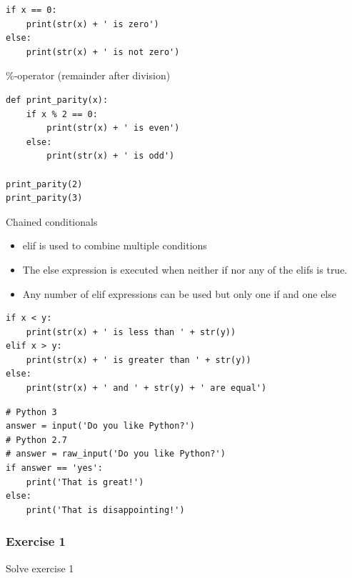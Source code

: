 \documentclass[10pt, a4paper]{beamer} %
\newcommand{\lb}[1]{{\color{mLightBrown}#1}}
\begin{document}
\begin{frame}
\begin{lstlisting}
if x == 0:
    print(str(x) + ' is zero')
else:
    print(str(x) + ' is not zero')
\end{lstlisting}

\framebreak

\begin{examples}
    \begin{block}{\color{mLightBrown}\%-operator (remainder after division)}
    {}
    \end{block}
\end{examples}
\begin{lstlisting}
def print_parity(x):
    if x % 2 == 0:
        print(str(x) + ' is even')
    else:
        print(str(x) + ' is odd')

print_parity(2)
print_parity(3)
\end{lstlisting}

\framebreak

\begin{block}{Chained conditionals}
    \begin{itemize}
        \item \lb{elif} is used to combine multiple conditions
        \item The \lb{else} expression is executed when neither \lb{if} nor any of the \lb{elif}s is true.
        \item Any number of \lb{elif} expressions can be used but only one \lb{if} and one \lb{else}
    \end{itemize}
\end{block}


\framebreak

\begin{examples}
    \begin{lstlisting}
if x < y:
    print(str(x) + ' is less than ' + str(y))
elif x > y:
    print(str(x) + ' is greater than ' + str(y))
else:
    print(str(x) + ' and ' + str(y) + ' are equal')
\end{lstlisting}
\begin{lstlisting}
# Python 3
answer = input('Do you like Python?')
# Python 2.7
# answer = raw_input('Do you like Python?')
if answer == 'yes':
    print('That is great!')
else:
    print('That is disappointing!')    
\end{lstlisting}    
\end{examples}
\end{frame}

{
\bfseries
\begin{frame}[c]\frametitle{Exercise 1}
    Solve exercise 1
\end{frame}
}
\end{document}
